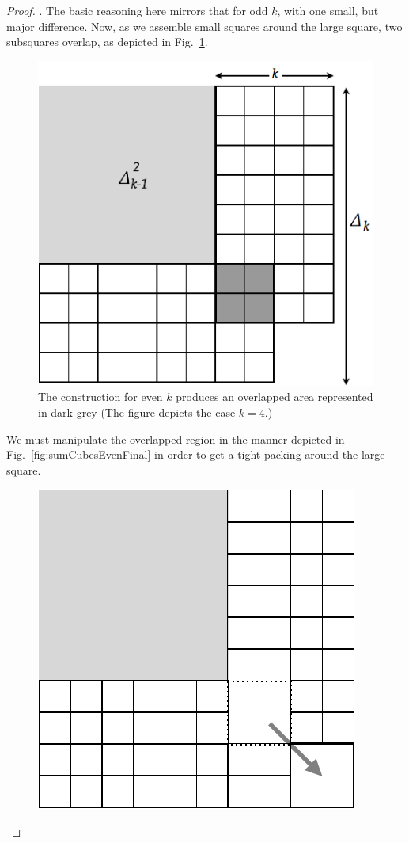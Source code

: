 \begin{proof}
\medskip

.
The basic reasoning here mirrors that for odd $k$, with one small, but major difference.   Now,  as we assemble small squares around the large square, two subsquares overlap, as depicted in Fig.~\ref{fig:sumCubesEven}.
\begin{figure}[hbt]
\begin{center}
       \includegraphics[scale=0.35]{FiguresMaths/SumCubesEven}
\caption{The construction for even $k$ produces an overlapped area represented in dark grey (The figure depicts the case $k=4$.)}
       \label{fig:sumCubesEven}
\end{center}
\end{figure}
We must manipulate the overlapped region in the manner depicted in Fig.~\ref{fig:sumCubesEvenFinal} in order to get a tight packing around the large square.
\begin{figure}[hbt]
\begin{center}
       \includegraphics[scale=0.35]{FiguresMaths/SumCubesEvenFinal}

\end{center}
\end{figure}
\end{proof}
